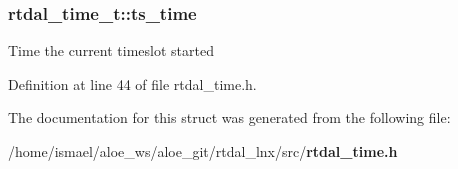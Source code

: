 \subsubsection[{ts\-\_\-time}]{ rtdal\-\_\-time\-\_\-t\-::ts\-\_\-time}\label{structrtdal__time__t_aa824a8a4634d0a302803df0694429cb0}
Time the current timeslot started 

Definition at line 44 of file rtdal\-\_\-time.\-h.



The documentation for this struct was generated from the following file\-:\begin{DoxyCompactItemize}
\item 
/home/ismael/aloe\-\_\-ws/aloe\-\_\-git/rtdal\-\_\-lnx/src/{\bf rtdal\-\_\-time.\-h}\end{DoxyCompactItemize}
